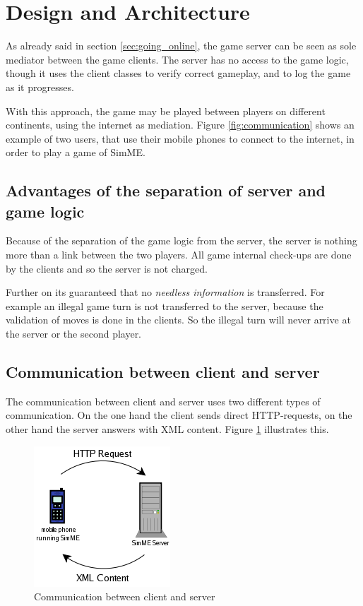 	
\section{Design and Architecture} \label{sec:architecture}

	As already said in section \ref{sec:going_online}, the game server can be
	seen as sole mediator between the game clients. The server has no access to
	the game logic, though it uses the client classes to verify correct
	gameplay, and to log the game as it progresses.
	
	With this approach, the game may be played between players on different
	continents, using the internet as mediation. Figure \ref{fig:communication}
	shows an example of two users, that use their mobile phones to connect to
	the internet, in order to play a game of SimME.
	
	\subsection{Advantages of the separation of server and game logic}

		Because of the separation of the game logic from the server, the server
		is nothing more than a link between the two players. All game internal
		check-ups are done by the clients and so the server is not charged.
		
		Further on its guaranteed that no \textit{needless information} is
		transferred. For example an illegal game turn is not transferred to the
		server, because the validation of moves is done in the clients. So the
		illegal turn will never arrive at the server or the second player.

	\subsection{Communication between client and server}

		The communication between client and server uses two different types of
		communication. On the one hand the client sends direct HTTP-requests, on
		the other hand the server answers with XML content. Figure
		\ref{fig:com_client_server} illustrates this.

		\begin{figure}[h]
		\begin{center}
			\includegraphics{pics/com_client_server.png}
			\caption{Communication between client and server}
			\label{fig:com_client_server}
		\end{center}
		\end{figure}

